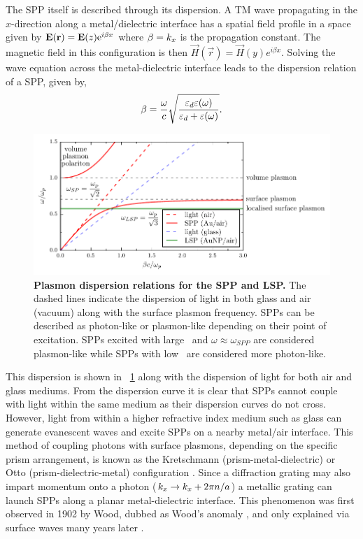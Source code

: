 \documentclass{article}
\begin{document}
The SPP itself is described through its dispersion. A TM wave propagating in the $x$-direction along a metal/dielectric interface has a spatial field profile in a space  given by $\mathbf{E}(\mathbf{r}) = \mathbf{E}(z)\mathrm{e}^{i\beta x}$ where $\beta=k_x$ is the propagation constant. The magnetic field in this configuration is then $\vec{H}(\vec{r}) = \vec{H}(y)e^{i\beta x}$. Solving the wave equation across the metal-dielectric interface leads to the dispersion relation of a SPP, given by,
\begin{equation}
	\beta = \frac{\omega}{c}\sqrt{\frac{\varepsilon_d\varepsilon(\omega)}{\varepsilon_d + \varepsilon(\omega)}}.
	\label{eq:spp_dispersion}
\end{equation}
\begin{figure}[bt]
\centering
\includegraphics{figures/spp_dispersion}
\caption[Plasmon dispersion relations for the SPP and LSP]{\textbf{Plasmon dispersion relations for the SPP and LSP.} The dashed lines indicate the dispersion of light in both glass and air (vacuum) along with the surface plasmon frequency. SPPs can be described as photon-like or plasmon-like depending on their point of excitation. SPPs excited with large \wvm\ and $\omega\approx\omega_{SPP}$ are considered plasmon-like while SPPs with low \wvm\ are considered more photon-like.}
\label{fig:spp_dispersion}
\end{figure}
This dispersion is shown in \figurename~\ref{fig:spp_dispersion} along with the dispersion of light for both air and glass mediums.
From the dispersion curve it is clear that SPPs cannot couple with light within the same medium as their dispersion curves do not cross. However, light from within a higher refractive index medium such as glass can generate evanescent waves and excite SPPs on a nearby metal/air interface. This method of coupling photons with surface plasmons, depending on the specific prism arrangement, is known as the Kretschmann (prism-metal-dielectric) or Otto (prism-dielectric-metal) configuration \cite{otto1968, kretschmann1971}. Since a diffraction grating may also impart momentum onto a photon ($k_x \rightarrow k_x + 2\pi n/a$) a metallic grating can launch SPPs along a planar metal-dielectric interface. This phenomenon was first observed in 1902 by Wood, dubbed as Wood's anomaly \cite{wood1902}, and only explained via surface waves many years later \cite{fano1941}.
\end{document}
